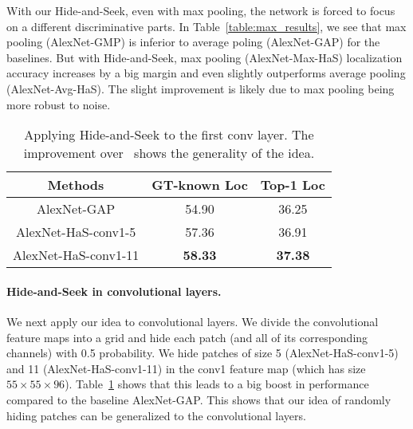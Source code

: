 \documentclass[10pt,twocolumn,letterpaper]{article}
\begin{document}
With our Hide-and-Seek, even with max pooling, the network is forced to focus on a different discriminative parts.   In Table~\ref{table:max_results}, we see that max pooling (AlexNet-GMP) is inferior to average poling (AlexNet-GAP) for the baselines. But with Hide-and-Seek, max pooling (AlexNet-Max-HaS) localization accuracy increases by a big margin and even slightly outperforms average pooling (AlexNet-Avg-HaS). The slight improvement is likely due to max pooling being more robust to noise.

\begin{table}[t!]
                \begin{center}
                    \footnotesize
                    \begin{tabular}{| c | c | c|}
                    \hline    	
                    Methods & GT-known Loc &  Top-1 Loc \\
                    \hline

                    AlexNet-GAP            & 54.90 & 36.25 \\
                    AlexNet-HaS-conv1-5            & 57.36 & 36.91  \\
                    AlexNet-HaS-conv1-11            &  \textbf{58.33}  & \textbf{37.38}  \\

                    \hline
                     \end{tabular}
                            \caption{Applying Hide-and-Seek to the first conv layer. The improvement over~\cite{zhou-cvpr2016} shows the generality of the idea.}
                            \label{table:conv_results}
                            \end{center}
                            \vspace*{-0.15in}
                            \end{table}\vspace{-10pt}\paragraph{Hide-and-Seek in convolutional layers.} We next apply our idea to convolutional layers.  We divide the convolutional feature maps into a grid and hide each patch (and all of its corresponding channels) with 0.5 probability.  We hide patches of size 5 (AlexNet-HaS-conv1-5) and 11 (AlexNet-HaS-conv1-11) in the conv1 feature map (which has size $ 55 \times 55 \times 96$).  Table~\ref{table:conv_results} shows that this leads to a big boost in performance compared to the baseline AlexNet-GAP. This shows that our idea of randomly hiding patches can be generalized to the convolutional layers. 
\end{document}
